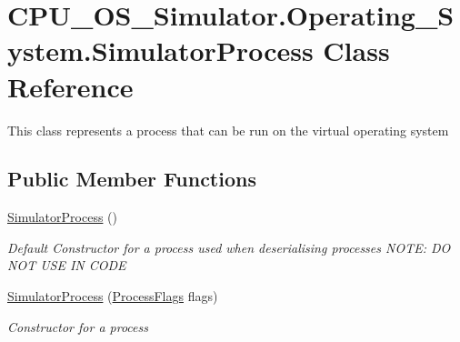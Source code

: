 \hypertarget{class_c_p_u___o_s___simulator_1_1_operating___system_1_1_simulator_process}{}\section{C\+P\+U\+\_\+\+O\+S\+\_\+\+Simulator.\+Operating\+\_\+\+System.\+Simulator\+Process Class Reference}
\label{class_c_p_u___o_s___simulator_1_1_operating___system_1_1_simulator_process}


This class represents a process that can be run on the virtual operating system  


\subsection*{Public Member Functions}
\begin{DoxyCompactItemize}
\item 
\hyperlink{class_c_p_u___o_s___simulator_1_1_operating___system_1_1_simulator_process_a6d9429aba3440d2bde6e8733eeee232f}{Simulator\+Process} ()
\begin{DoxyCompactList}\small\item\em Default Constructor for a process used when deserialising processes N\+O\+T\+E\+: D\+O N\+O\+T U\+S\+E I\+N C\+O\+D\+E \end{DoxyCompactList}\item 
\hyperlink{class_c_p_u___o_s___simulator_1_1_operating___system_1_1_simulator_process_a30b212f64f058e2f2c06936f8f63a492}{Simulator\+Process} (\hyperlink{struct_c_p_u___o_s___simulator_1_1_operating___system_1_1_process_flags}{Process\+Flags} flags)
\begin{DoxyCompactList}\small\item\em Constructor for a process \end{DoxyCompactList}\end{DoxyCompactItemize}
